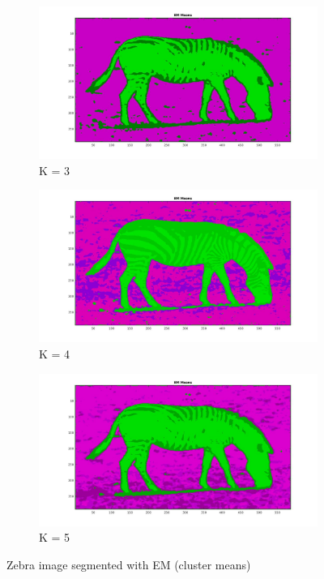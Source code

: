 \documentclass[paper=a4, fontsize=11pt]{scrartcl} %
\numberwithin{equation}{section} %
\numberwithin{figure}{section} %
\numberwithin{table}{section} %
\begin{document}
\begin{figure}
\centering
\begin{subfigure}{.3\textwidth}
  \centering
  \includegraphics[width=\linewidth]{zebra/em3_means.jpg}
  \caption{K = 3}
\end{subfigure}
\begin{subfigure}{.3\textwidth}
  \centering
  \includegraphics[width=\linewidth]{zebra/em4_means.jpg}
  \caption{K = 4}
\end{subfigure}
\begin{subfigure}{.3\textwidth}
  \centering
  \includegraphics[width=\linewidth]{zebra/em5_means.jpg}
  \caption{K = 5}
\end{subfigure}
\caption{Zebra image segmented with EM (cluster means)}
\label{fig:em_zebra}
\end{figure}
\end{document}
